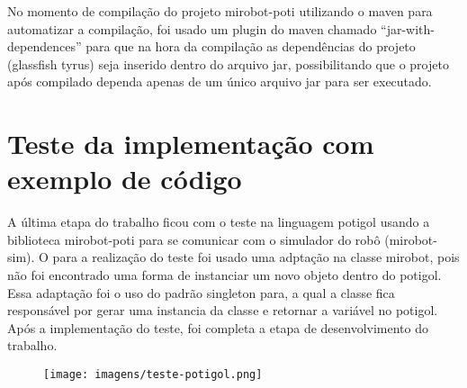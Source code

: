 No momento de compilação do projeto mirobot-poti utilizando o maven para
automatizar a compilação, foi usado um plugin do maven chamado
``jar-with-dependences'' para que na hora da compilação as dependências do
projeto (glassfish tyrus) seja inserido dentro do arquivo jar, possibilitando
que o projeto após compilado dependa apenas de um único arquivo jar para ser
executado.

\section{Teste da implementação com exemplo de código}
\label{sec:testemirobot}

A última etapa do trabalho ficou com o teste na linguagem potigol usando a
biblioteca mirobot-poti para se comunicar com o simulador do robô
(mirobot-sim). O para a realização do teste foi usado uma adptação na classe
mirobot, pois não foi encontrado uma forma de instanciar um novo objeto dentro
do potigol. Essa adaptação foi o uso do padrão singleton para, a qual a classe
fica responsável por gerar uma instancia da classe e retornar a variável no
potigol. Após a implementação do teste, foi completa a etapa de desenvolvimento
do trabalho.

\begin{figure}[H]
\centering
\texttt{[image: imagens/teste-potigol.png]} 
\label{fig:testepotigol}
\end{figure}
